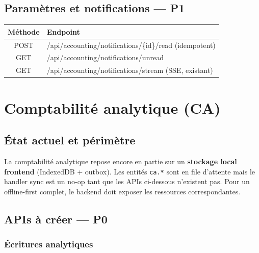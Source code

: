 \documentclass[12pt,a4paper]{report}
\begin{document}
\section{Paramètres et notifications --- P1}

\begin{longtable}{@{}cp{7cm}@{}}
\hline
\textbf{Méthode} & \textbf{Endpoint} \\
\hline
\endhead
POST & /api/accounting/notifications/\{id\}/read (idempotent) \\
\hline
GET & /api/accounting/notifications/unread \\
\hline
GET & /api/accounting/notifications/stream (SSE, existant) \\
\hline
\end{longtable}

\chapter{Comptabilité analytique (CA)}

\section{État actuel et périmètre}

La comptabilité analytique repose encore en partie sur un \textbf{stockage local frontend} (IndexedDB + outbox). Les entités \texttt{ca.*} sont en file d'attente mais le handler sync est un no-op tant que les APIs ci-dessous n'existent pas. Pour un offline-first complet, le backend doit exposer les ressources correspondantes.

\section{APIs à créer --- P0}

\subsection{Écritures analytiques}
\end{document}
